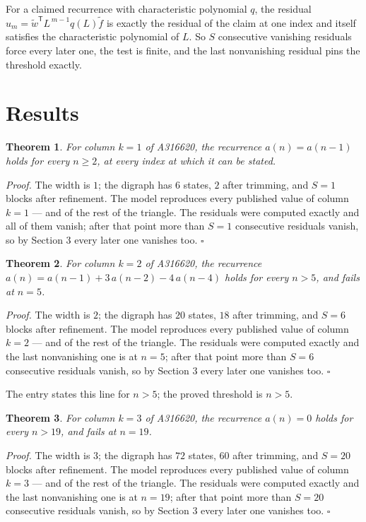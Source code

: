 \documentclass[11pt]{article}
\newtheorem{theorem}{Theorem}
\theoremstyle{definition}
\begin{document}
For a claimed recurrence with characteristic polynomial $q$, the residual $u_m = \tilde w^{\mathsf T}L^{\,m-1}q(L)\tilde f$ is exactly the residual of the claim at one index and itself satisfies the characteristic polynomial of $L$. So $S$ consecutive vanishing residuals force every later one, the test is finite, and the last nonvanishing residual pins the threshold exactly.

\section{Results}

\begin{theorem} For column $k = 1$ of A316620, the recurrence $a(n) = a(n-1)$ holds for every $n \ge 2$, at every index at which it can be stated.\end{theorem}

{\itshape Proof.} The width is $1$; the digraph has $6$ states, $2$ after trimming, and $S = 1$ blocks after refinement. The model reproduces every published value of column $k = 1$ --- and of the rest of the triangle. The residuals were computed exactly and all of them vanish; after that point more than $S = 1$ consecutive residuals vanish, so by Section 3 every later one vanishes too. $\square$

\begin{theorem} For column $k = 2$ of A316620, the recurrence $a(n) = a(n-1) + 3\,a(n-2) - 4\,a(n-4)$ holds for every $n > 5$, and fails at $n = 5$.\end{theorem}

{\itshape Proof.} The width is $2$; the digraph has $20$ states, $18$ after trimming, and $S = 6$ blocks after refinement. The model reproduces every published value of column $k = 2$ --- and of the rest of the triangle. The residuals were computed exactly and the last nonvanishing one is at $n = 5$; after that point more than $S = 6$ consecutive residuals vanish, so by Section 3 every later one vanishes too. $\square$

The entry states this line for $n > 5$; the proved threshold is $n > 5$.

\begin{theorem} For column $k = 3$ of A316620, the recurrence $a(n) = 0$ holds for every $n > 19$, and fails at $n = 19$.\end{theorem}

{\itshape Proof.} The width is $3$; the digraph has $72$ states, $60$ after trimming, and $S = 20$ blocks after refinement. The model reproduces every published value of column $k = 3$ --- and of the rest of the triangle. The residuals were computed exactly and the last nonvanishing one is at $n = 19$; after that point more than $S = 20$ consecutive residuals vanish, so by Section 3 every later one vanishes too. $\square$
\end{document}
